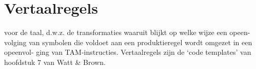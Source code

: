 \documentclass[]{article}
\begin{document}
%
%


%
%

%

%
%
%
%
%
%
%
%
%
%
%



\newpage
\section{Vertaalregels}
voor de taal, d.w.z. de transformaties waaruit blijkt op welke wijze een opeen-
volging van symbolen die voldoet aan een produktieregel wordt omgezet in een opeenvol-
ging van TAM-instructies. Vertaalregels zijn de ‘code templates’ van hoofdstuk 7 van Watt
\& Brown.
\end{document}
